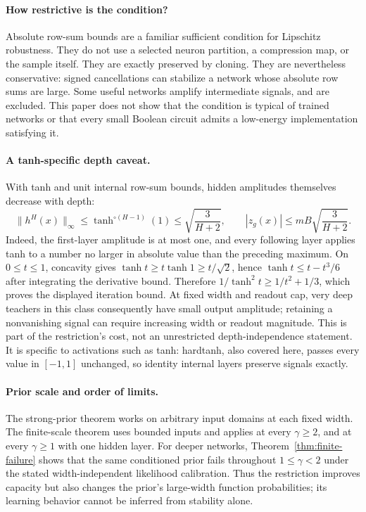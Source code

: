 \documentclass[11pt]{article}
\theoremstyle{definition}\newtheorem{definition}[theorem]{Definition}
\theoremstyle{remark}\newtheorem{remark}[theorem]{Remark}
\begin{document}
\paragraph{How restrictive is the condition?}
Absolute row-sum bounds are a familiar sufficient condition for Lipschitz robustness. They do not use a selected neuron partition, a compression map, or the sample itself. They are exactly preserved by cloning. They are nevertheless conservative: signed cancellations can stabilize a network whose absolute row sums are large. Some useful networks amplify intermediate signals, and are excluded. This paper does not show that the condition is typical of trained networks or that every small Boolean circuit admits a low-energy implementation satisfying it.

\paragraph{A tanh-specific depth caveat.}
With tanh and unit internal row-sum bounds, hidden amplitudes themselves decrease with depth:
\[
 \|h^H(x)\|_\infty\le\tanh^{\circ(H-1)}(1)
       \le\sqrt{\frac3{H+2}},
 \qquad |z_g(x)|\le mB\sqrt{\frac3{H+2}}.
\]
Indeed, the first-layer amplitude is at most one, and every following layer applies tanh to a number no larger in absolute value than the preceding maximum. On $0\le t\le1$, concavity gives $\tanh t\ge t\tanh1\ge t/\sqrt2$, hence $\tanh t\le t-t^3/6$ after integrating the derivative bound. Therefore $1/\tanh^2t\ge1/t^2+1/3$, which proves the displayed iteration bound. At fixed width and readout cap, very deep teachers in this class consequently have small output amplitude; retaining a nonvanishing signal can require increasing width or readout magnitude. This is part of the restriction's cost, not an unrestricted depth-independence statement. It is specific to activations such as tanh: hardtanh, also covered here, passes every value in $[-1,1]$ unchanged, so identity internal layers preserve signals exactly.

\paragraph{Prior scale and order of limits.}
The strong-prior theorem works on arbitrary input domains at each fixed width. The finite-scale theorem uses bounded inputs and applies at every $\gamma\geq2$, and at every $\gamma\geq1$ with one hidden layer. For deeper networks, Theorem~\ref{thm:finite-failure} shows that the same conditioned prior fails throughout $1\leq\gamma<2$ under the stated width-independent likelihood calibration. Thus the restriction improves capacity but also changes the prior's large-width function probabilities; its learning behavior cannot be inferred from stability alone.
\end{document}
